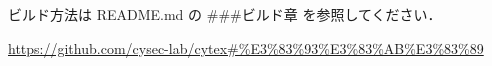 \documentclass{article}
\begin{document}
ビルド方法は README.md の \#\#\#ビルド章 を参照してください．

\url{https://github.com/cysec-lab/cytex#%E3%83%93%E3%83%AB%E3%83%89}
\end{document}
